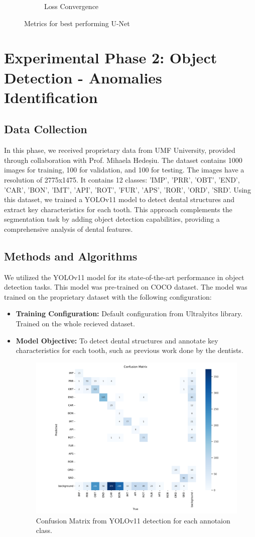 \documentclass[12pt]{article}
\begin{document}
\begin{figure}[htbp]
\begin{subfigure}[b]{0.45\textwidth}
        \caption{Loss Convergence}
        \label{fig:image2}
    \end{subfigure}
    \caption{Metrics for best performing U-Net}
    \label{fig:side_by_side}
\end{figure}

\section{Experimental Phase 2: Object Detection - Anomalies Identification}

\subsection{Data Collection}
In this phase, we received proprietary data from UMF University, provided through collaboration with Prof. Mihaela Hedeșiu. The dataset contains 1000 images for training, 100 for validation, and 100 for testing. The images have a resolution of 2775x1475. It contains 12 classes: 'IMP', 'PRR', 'OBT', 'END', 'CAR', 'BON', 'IMT', 'API', 'ROT', 'FUR', 'APS', 'ROR', 'ORD', 'SRD'.  Using this dataset, we trained a YOLOv11 model to detect dental structures and extract key characteristics for each tooth. This approach complements the segmentation task by adding object detection capabilities, providing a comprehensive analysis of dental features.

\subsection{Methods and Algorithms}
We utilized the YOLOv11 model for its state-of-the-art performance in object detection tasks. This model was pre-trained on COCO dataset. The model was trained on the proprietary dataset with the following configuration:
\begin{itemize}
    \item \textbf{Training Configuration:} Default configuration from Ultralyitcs library. Trained on the whole recieved dataset.
    \item \textbf{Model Objective:} To detect dental structures and annotate key characteristics for each tooth, such as previous work done by the dentists.
    \begin{figure}[H]
    \centering
    \includegraphics[width=0.6\linewidth]{yolo_conf_matrix_1.png}
    \caption{Confusion Matrix from YOLOv11 detection for each annotaion class.}
    \label{fig:yolo-output}
\end{figure}
\end{itemize}
\end{document}

